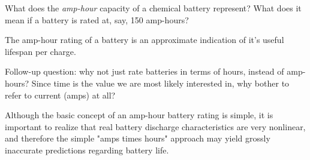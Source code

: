 

What does the {\it amp-hour} capacity of a chemical battery represent?  What does it mean if a battery is rated at, say, 150 amp-hours?







The amp-hour rating of a battery is an approximate indication of it's useful lifespan per charge.

\vskip 10pt

Follow-up question: why not just rate batteries in terms of hours, instead of amp-hours?  Since time is the value we are most likely interested in, why bother to refer to current (amps) at all?







Although the basic concept of an amp-hour battery rating is simple, it is important to realize that real battery discharge characteristics are very nonlinear, and therefore the simple "amps times hours" approach may yield grossly inaccurate predictions regarding battery life.




